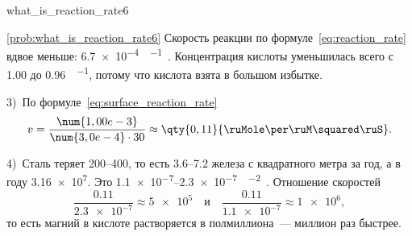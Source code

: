 \begin{problem}{}{what_is_reaction_rate6}
\begin{sol}{\ref{prob:what_is_reaction_rate6}}
        Скорость реакции по формуле~\eqref{eq:reaction_rate} вдвое меньше: \qty{6,7e-4}{\ruMole\per\ruL\ruS}. Концентрация кислоты уменьшилась всего с \num{1,00} до \qty{0,96}{\ruMole\per\ruL}, потому что кислота взята в большом избытке.

        3)~По формуле~\eqref{eq:surface_reaction_rate}
        \begin{equation*}
            v = \frac{\num{1,00e-3}}{\num{3,0e-4} \cdot 30} \approx \qty{0,11}{\ruMole\per\ruM\squared\ruS}.
        \end{equation*}

        4)~Сталь теряет \num{200}--\qty{400}{\ruG}, то есть \num{3,6}--\qty{7,2}{\ruMole} железа с квадратного метра за год, а в году \qty{3,16e7}{\ruS}. Это \num{1,1e-7}--\qty{2,3e-7}{\ruMole\per\ruM\squared\ruS}. Отношение скоростей
        \begin{equation*}
            \frac{\num{0,11}}{\num{2,3e-7}} \approx \num{5e5} \quad\text{и}\quad \frac{\num{0,11}}{\num{1,1e-7}} \approx \num{1e6},
        \end{equation*}
        то есть магний в кислоте растворяется в полмиллиона~--- миллион раз быстрее.
    \end{sol}
\end{problem}

